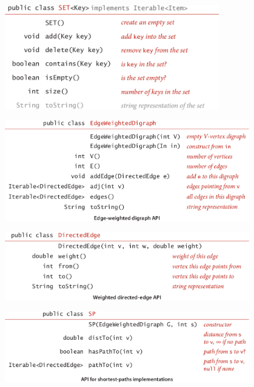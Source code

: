 \documentclass[addpoints]{exam}
\begin{document}
\begin{questions}
\begin{center}
		\vspace{0.5cm}

		\hspace{2cm} \includegraphics[width=0.7\textwidth]{Pics/API-SET}

		\vspace{1cm}

		\includegraphics[width=0.8\textwidth]{Pics/API-EWDG}

		\vspace{1cm}

		\includegraphics[width=0.8\textwidth]{Pics/API-DE}

		\vspace{1cm}

		\includegraphics[width=0.8\textwidth]{Pics/API-SP}
	\end{center}


\end{questions}
\end{document}
